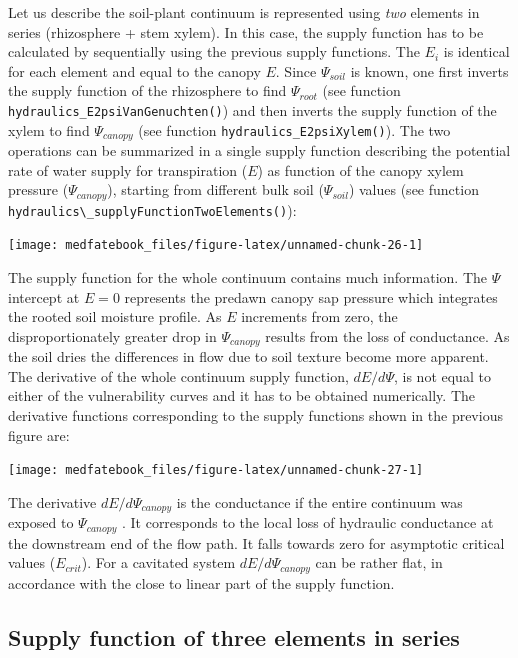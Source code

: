 \documentclass[]{book}
\begin{document}
Let us describe the soil-plant continuum is represented using \emph{two}
elements in series (rhizosphere + stem xylem). In this case, the supply
function has to be calculated by sequentially using the previous supply
functions. The \(E_i\) is identical for each element and equal to the
canopy \(E\). Since \(\Psi_{soil}\) is known, one first inverts the
supply function of the rhizosphere to find \(\Psi_{root}\) (see function
\texttt{hydraulics\_E2psiVanGenuchten()}) and then inverts the supply
function of the xylem to find \(\Psi_{canopy}\) (see function
\texttt{hydraulics\_E2psiXylem()}). The two operations can be summarized
in a single supply function describing the potential rate of water
supply for transpiration (\(E\)) as function of the canopy xylem
pressure (\(\Psi_{canopy}\)), starting from different bulk soil
(\(\Psi_{soil}\)) values (see function
\texttt{hydraulics\textbackslash{}\_supplyFunctionTwoElements()}):

\begin{center}\texttt{[image: medfatebook\_files/figure-latex/unnamed-chunk-26-1]} \end{center}

The supply function for the whole continuum contains much information.
The \(\Psi\) intercept at \(E=0\) represents the predawn canopy sap
pressure which integrates the rooted soil moisture profile. As \(E\)
increments from zero, the disproportionately greater drop in
\(\Psi_{canopy}\) results from the loss of conductance. As the soil
dries the differences in flow due to soil texture become more apparent.
The derivative of the whole continuum supply function, \(dE/d\Psi\), is
not equal to either of the vulnerability curves and it has to be
obtained numerically. The derivative functions corresponding to the
supply functions shown in the previous figure are:

\begin{center}\texttt{[image: medfatebook\_files/figure-latex/unnamed-chunk-27-1]} \end{center}

The derivative \(dE/d\Psi_{canopy}\) is the conductance if the entire
continuum was exposed to \(\Psi_{canopy}\) \citep{Sperry2015}. It
corresponds to the local loss of hydraulic conductance at the downstream
end of the flow path. It falls towards zero for asymptotic critical
values (\(E_{crit}\)). For a cavitated system \(dE/d\Psi_{canopy}\) can
be rather flat, in accordance with the close to linear part of the
supply function.

\subsection{Supply function of three elements in
series}\label{supply-function-of-three-elements-in-series}
\end{document}
